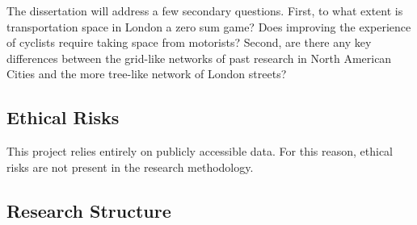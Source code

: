 The dissertation will address a few secondary questions. First, to what extent is transportation space in London a zero sum game? Does improving the experience of cyclists require taking space from motorists? Second, are there any key differences between the grid-like networks of past research in North American Cities and the more tree-like network of London streets? 

%
%
%
%

\subsection{Ethical Risks}

This project relies entirely on publicly accessible data. For this reason, ethical risks are not present in the research methodology.  

\subsection{Research Structure}


